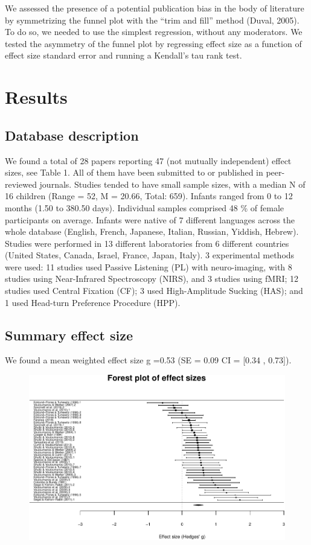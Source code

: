 \documentclass[man]{apa6}
\begin{document}
We assessed the presence of a potential publication bias in the body of
literature by symmetrizing the funnel plot with the \enquote{trim and
fill} method (Duval, 2005). To do so, we needed to use the simplest
regression, without any moderators. We tested the asymmetry of the
funnel plot by regressing effect size as a function of effect size
standard error and running a Kendall's tau rank test.

\section{Results}\label{results}

\subsection{Database description}\label{database-description}

We found a total of 28 papers reporting 47 (not mutually independent)
effect sizes, see Table 1. All of them have been submitted to or
published in peer-reviewed journals. Studies tended to have small sample
sizes, with a median N of 16 children (Range = 52, M = 20.66, Total:
659). Infants ranged from 0 to 12 months (1.50 to 380.50 days).
Individual samples comprised 48 \% of female participants on average.
Infants were native of 7 different languages across the whole database
(English, French, Japanese, Italian, Russian, Yiddish, Hebrew). Studies
were performed in 13 different laboratories from 6 different countries
(United States, Canada, Israel, France, Japan, Italy). 3 experimental
methods were used: 11 studies used Passive Listening (PL) with
neuro-imaging, with 8 studies using Near-Infrared Spectroscopy (NIRS),
and 3 studies using fMRI; 12 studies used Central Fixation (CF); 3 used
High-Amplitude Sucking (HAS); and 1 used Head-turn Preference Procedure
(HPP).

\subsection{Summary effect size}\label{summary-effect-size}

We found a mean weighted effect size g =0.53 (SE = 0.09 CI = {[}0.34 ,
0.73{]}).

\begin{figure}
\centering
\includegraphics{MA_speech_pref_files/figure-latex/forest plot-1.pdf}
\caption{}
\end{figure}
\end{document}
